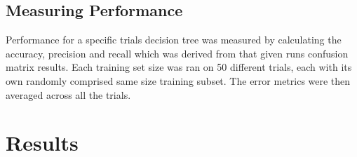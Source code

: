 \documentclass[conference]{IEEEtran}
\begin{document}
\subsection*{Measuring Performance}
    Performance for a specific trials decision tree was measured by calculating the accuracy, precision and recall which was derived from that given runs confusion matrix results. Each training set size was ran on 50 different trials, each with its own randomly comprised same size training subset. The error metrics were then averaged across all the trials.

\section{Results}
\end{document}
